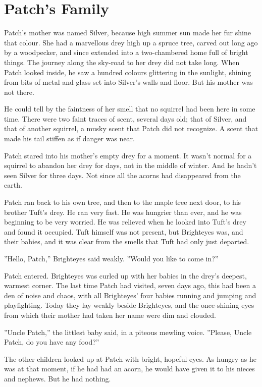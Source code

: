\documentclass[12pt]{book}
\begin{document}
\section{Patch's Family}

 Patch's mother was named Silver, because high summer sun made her fur shine that colour. She had a marvellous drey high up a spruce tree, carved out long ago by a woodpecker, and since extended into a two-chambered home full of bright things. The journey along the sky-road to her drey did not take long. When Patch looked inside, he saw a hundred colours glittering in the sunlight, shining from bits of metal and glass set into Silver's walls and floor. But his mother was not there.\par
He could tell by the faintness of her smell that no squirrel had been here in some time. There were two faint traces of scent, several days old; that of Silver, and that of another squirrel, a musky scent that Patch did not recognize. A scent that made his tail stiffen as if danger was near.\par
 Patch stared into his mother's empty drey for a moment. It wasn't normal for a squirrel to abandon her drey for days, not in the middle of winter. And he hadn't seen Silver for three days. Not since all the acorns had disappeared from the earth.\par
 Patch ran back to his own tree, and then to the maple tree next door, to his brother Tuft's drey. He ran very fast. He was hungrier than ever, and he was beginning to be very worried. He was relieved when he looked into Tuft's drey and found it occupied. Tuft himself was not present, but Brighteyes was, and their babies, and it was clear from the smells that Tuft had only just departed.\par
 ''Hello, Patch,'' Brighteyes said weakly. ''Would you like to come in?''\par
 Patch entered. Brighteyes was curled up with her babies in the drey's deepest, warmest corner. The last time Patch had visited, seven days ago, this had been a den of noise and chaos, with all Brighteyes' four babies running and jumping and playfighting. Today they lay weakly beside Brighteyes, and the once-shining eyes from which their mother had taken her name were dim and clouded.\par
 ''Uncle Patch,'' the littlest baby said, in a piteous mewling voice. ''Please, Uncle Patch, do you have any food?''\par
 The other children looked up at Patch with bright, hopeful eyes. As hungry as he was at that moment, if he had had an acorn, he would have given it to his nieces and nephews. But he had nothing.\par
\end{document}
